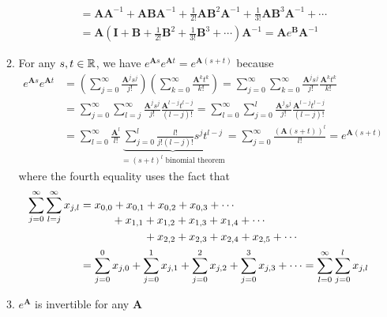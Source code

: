 \documentclass[12pt,a4paper]{article}
\begin{document}
\begin{itemize}
\begin{enumerate}
\begin{align}
        & = \bm{A}\bm{A}^{-1} + \bm{A}\bm{B}\bm{A}^{-1} + \frac{1}{2!}\bm{A}\bm{B}^{2}\bm{A}^{-1} + \frac{1}{3!}\bm{A}\bm{B}^{3}\bm{A}^{-1} + \cdots  \nonumber \\
        & = \bm{A} \left(\bm{I} + \bm{B} + \frac{1}{2!}\bm{B}^{2} + \frac{1}{3!}\bm{B}^{3} + \cdots \right)\bm{A}^{-1} = \bm{A}e^{\bm{B}}\bm{A}^{-1}
          \nonumber%
      \end{align}
    \item For any $s, t \in \mathbb{R}$, we have $e^{\bm{A}s}e^{\bm{A}t} = e^{\bm{A}(s+t)}$
      because
      \begin{align}
        e^{\bm{A}s}e^{\bm{A}t}
        & 
          = \left(\sum_{j=0}^{\infty} \frac{\bm{A}^{j}s^{j}}{j!}\right)\left(\sum_{k=0}^{\infty}\frac{\bm{A}^{k}t^{k}}{k!}\right)
          = \sum_{j=0}^{\infty}\sum_{k=0}^{\infty}\frac{\bm{A}^{j}s^{j}}{j!}\frac{\bm{A}^{k}t^{k}}{k!} \nonumber \\
        &
          = \sum_{j=0}^{\infty}\sum_{l=j}^{\infty}\frac{\bm{A}^{j}s^{j}}{j!}\frac{\bm{A}^{l-j}t^{l-j}}{(l-j)!}
          = \sum_{l=0}^{\infty}\sum_{j=0}^{l}\frac{\bm{A}^{j}s^{j}}{j!}\frac{\bm{A}^{l-j}t^{l-j}}{(l-j)!} \nonumber \\
        &
          = \sum_{l=0}^{\infty}\frac{\bm{A}^{l}}{l!}\underbrace{\sum_{j=0}^{l}\frac{l!}{j!(l-j)!}s^{j}t^{l-j}}_{=(s+t)^{l} \text{ binomial theorem}}
          = \sum_{j=0}^{\infty}\frac{(\bm{A}(s+t))^{l}}{l!}
          = e^{\bm{A}(s+t)}
          \nonumber%
      \end{align}
      where the fourth equality uses the fact that
      \begin{align}
        \sum_{j=0}^{\infty}\sum_{l=j}^{\infty}x_{j,l}
          & = x_{0,0} + x_{0,1} + x_{0,2} + x_{0,3} + \cdots  \nonumber \\[-13pt]
          & \qquad\quad\hspace{-1pt} + x_{1,1} + x_{1,2} + x_{1,3} + x_{1,4} + \cdots  \nonumber \\
          & \qquad\qquad\quad\hspace{8pt} + x_{2,2} + x_{2,3} + x_{2,4} + x_{2,5} + \cdots  \nonumber \\
          & = \sum_{j=0}^{0}x_{j,0} + \sum_{j=0}^{1}x_{j,1} + \sum_{j=0}^{2}x_{j,2} + \sum_{j=0}^{3}x_{j,3} + \cdots = \sum_{l=0}^{\infty}\sum_{j=0}^{l}x_{j,l} %
      \nonumber%
      \end{align}
    \item $e^{\bm{A}}$ is invertible for any $\bm{A}$

\end{enumerate}
\end{itemize}
\end{document}
